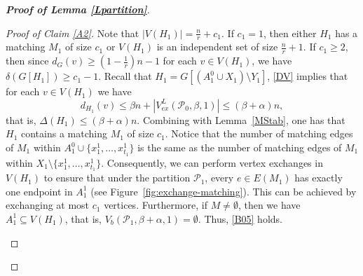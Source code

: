 \documentclass[11pt, a4paper]{article}
\theoremstyle{definition}
\newcommand{\<}{\subseteq}
\begin{document}
\begin{proof}[\bf Proof of Lemma \ref{Lpartition}]
\begin{proof}[Proof of Claim \ref{A2}]
Note that $|V(H_1)|=\frac{n}{r}+c_1$. If $c_1= 1$, then either $H_1$ has a matching $M_1$ of size $c_1$ or $V(H_1)$ is an independent set of size $\frac{n}{r}+1$. %
If $c_1\ge 2$, then since  $d_G(v)\ge (1-\frac{1}{r})n-1$ for each $v\in V(H_1)$, we have $\delta(G[H_1])\ge c_1-1$.  %
Recall that $H_1=G[(A^0_1\cup X_1)\setminus Y_1]$, \eqref{DV} implies that for each $v\in V(H_1)$ we have 
$$d_{H_1}(v)\le \beta n+|V_{ex}^L(\mathcal{P}_0, \beta,1)|\le (\beta+\alpha)n,$$
 that is, $\Delta(H_1)\le(\beta+\alpha)n$. %
 Combining with Lemma~\ref{MStab}, one has that $H_1$ contains a matching $M_1$ of size $c_1$. Notice that 
the number of matching edges of $M_1$ within $A_1^0\cup \{x_1^1,\ldots,x_{t_1}^1\}$ is the same as the number of matching edges of $M_1$ within $X_1\setminus \{x_1^1,\ldots,x_{t_1}^1\}$. 
Consequently, we can perform vertex exchanges in $V(H_1)$ to ensure that under the partition $\mathcal{P}_1$, every $e \in E(M_1)$ has exactly one endpoint in $A_1^1$ (see Figure~\ref{fig:exchange-matching}). This can be achieved by exchanging at most $c_1$ vertices. %
Furthermore, if $M\ne \emptyset$, then we have $A_1^1\subseteq V(H_1)$, that is, $V_b(\mathcal{P}_1, \beta+\alpha,1)=\emptyset$.
Thus, \ref{B05} holds. 
\begin{figure}[ht]

\end{figure}
\end{proof}
\end{proof}
\end{document}
